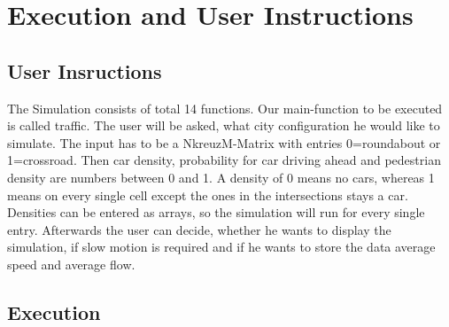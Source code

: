 \section{Execution and User Instructions}
\subsection{User Insructions}
The Simulation consists of total 14 functions. Our main-function to be executed is called traffic. 
The user will be asked, what city configuration he would like to simulate. The input has to be a NkreuzM-Matrix with entries 0=roundabout or 1=crossroad. 
Then car density, probability for car driving ahead and pedestrian density are numbers between 0 and 1. A density of 0 means no cars, whereas 1 means on every single cell except the ones in the intersections stays a car. 
Densities can be entered as arrays, so the simulation will run for every single entry. 
Afterwards the user can decide, whether he wants to display the simulation, if slow motion is required and if he wants to store the data average speed and average flow. \\
\subsection{Execution}
